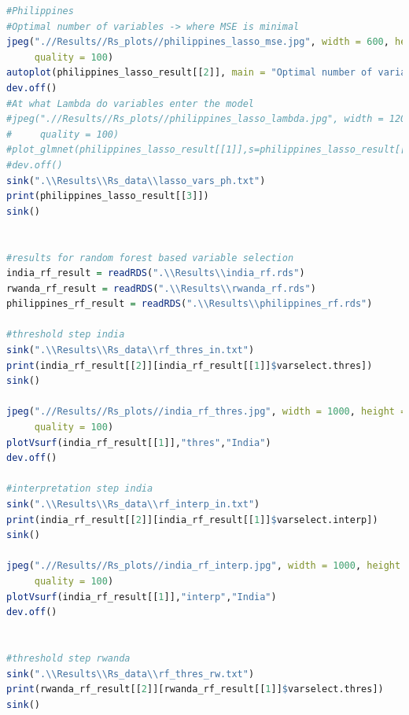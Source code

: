 \documentclass[11pt]{article}
\begin{document}
\begin{lstlisting}[language= R]
#Philippines
#Optimal number of variables -> where MSE is minimal
jpeg(".//Results//Rs_plots//philippines_lasso_mse.jpg", width = 600, height = 600, units = "px", pointsize = 20,
     quality = 100)
autoplot(philippines_lasso_result[[2]], main = "Optimal number of variables by MSE for Philippines")
dev.off()
#At what Lambda do variables enter the model
#jpeg(".//Results//Rs_plots//philippines_lasso_lambda.jpg", width = 1200, height = 1200, units = "px", pointsize = 20,
#     quality = 100)
#plot_glmnet(philippines_lasso_result[[1]],s=philippines_lasso_result[[2]]$lambda.min,col =philippines_lasso_result[[3]]$colors, label = TRUE )
#dev.off()
sink(".\\Results\\Rs_data\\lasso_vars_ph.txt")
print(philippines_lasso_result[[3]])
sink() 


#results for random forest based variable selection 
india_rf_result = readRDS(".\\Results\\india_rf.rds")
rwanda_rf_result = readRDS(".\\Results\\rwanda_rf.rds")
philippines_rf_result = readRDS(".\\Results\\philippines_rf.rds")

#threshold step india
sink(".\\Results\\Rs_data\\rf_thres_in.txt")
print(india_rf_result[[2]][india_rf_result[[1]]$varselect.thres])
sink() 

jpeg(".//Results//Rs_plots//india_rf_thres.jpg", width = 1000, height = 700, units = "px", pointsize = 20,
     quality = 100)
plotVsurf(india_rf_result[[1]],"thres","India")
dev.off()

#interpretation step india
sink(".\\Results\\Rs_data\\rf_interp_in.txt")
print(india_rf_result[[2]][india_rf_result[[1]]$varselect.interp])
sink()

jpeg(".//Results//Rs_plots//india_rf_interp.jpg", width = 1000, height = 700, units = "px", pointsize = 20,
     quality = 100)
plotVsurf(india_rf_result[[1]],"interp","India")
dev.off()


#threshold step rwanda
sink(".\\Results\\Rs_data\\rf_thres_rw.txt")
print(rwanda_rf_result[[2]][rwanda_rf_result[[1]]$varselect.thres])
sink() 


\end{lstlisting}
\end{document}
